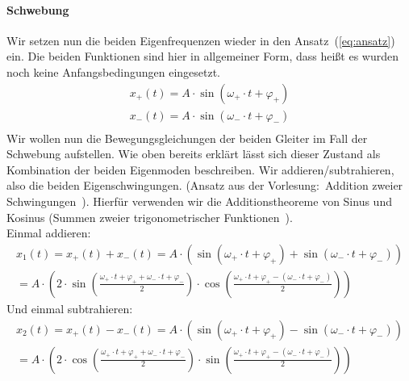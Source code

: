 \documentclass{article}
\begin{document}
              \paragraph{Schwebung}
                  Wir setzen nun die beiden Eigenfrequenzen wieder in den Ansatz~(\ref{eq:ansatz}) ein.
                  Die beiden Funktionen sind hier in allgemeiner Form, dass heißt es wurden noch keine Anfangsbedingungen eingesetzt.
                  \begin{equation}
                      \begin{gathered}
                          x_{+}(t) = A \cdot \sin( \omega_{+} \cdot t + \varphi_{+} ) \\
                          x_{-}(t) = A \cdot \sin( \omega_{-} \cdot t + \varphi_{-} ) \\
                      \end{gathered}
                  \end{equation}
                  Wir wollen nun die Bewegungsgleichungen der beiden Gleiter im Fall der Schwebung aufstellen.
                  Wie oben bereits erklärt lässt sich dieser Zustand als Kombination der beiden Eigenmoden beschreiben.
                  Wir addieren/subtrahieren, also die beiden Eigenschwingungen. (Ansatz aus der Vorlesung:~Addition zweier Schwingungen~\cite{ExPhy1}).
                  Hierfür verwenden wir die Additionstheoreme von Sinus und Kosinus (Summen zweier trigonometrischer Funktionen~\cite{Trigonometrie}). \\
                  Einmal addieren:
                  \begin{equation}
                      \begin{gathered}\label{eq:x1_umformung}
                          x_1(t) = x_{+}(t) + x_{-}(t) = A \cdot ( \sin( \omega_{+} \cdot t + \varphi_{+} ) + \sin( \omega_{-} \cdot t + \varphi_{-} ) ) \\
                          = A \cdot \left( 2 \cdot \sin\left( \frac{ \omega_{+} \cdot t + \varphi_{+} + \omega_{-} \cdot t + \varphi_{-} }{2} \right) \cdot \cos\left( \frac{ \omega_{+} \cdot t + \varphi_{+} - \left( \omega_{-} \cdot t + \varphi_{-} \right) }{2} \right) \right)
                      \end{gathered}
                  \end{equation}
                  Und einmal subtrahieren:
                  \begin{equation}\label{eq:x2_umformung}
                      \begin{gathered}
                          x_2(t) = x_{+}(t) - x_{-}(t)
                          = A \cdot ( \sin( \omega_{+} \cdot t + \varphi_{+} ) - \sin( \omega_{-} \cdot t + \varphi_{-} ) ) \\
                          = A \cdot \left( 2 \cdot \cos\left( \frac{ \omega_{+} \cdot t + \varphi_{+} + \omega_{-} \cdot t + \varphi_{-} }{2} \right) \cdot \sin\left( \frac{ \omega_{+} \cdot t + \varphi_{+} - \left( \omega_{-} \cdot t + \varphi_{-} \right) }{2} \right) \right)
                      \end{gathered}
                  \end{equation}
\end{document}
